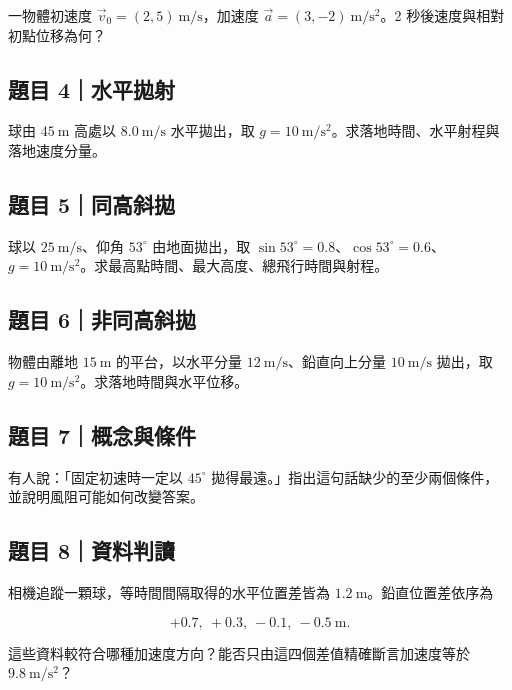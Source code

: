 \documentclass[11pt,a4paper]{article}
\begin{document}
一物體初速度 \(\vec v_0=(2,5)\ \mathrm{m/s}\)，加速度 \(\vec a=(3,-2)\ \mathrm{m/s^2}\)。2 秒後速度與相對初點位移為何？

\subsection{題目 4｜水平拋射}\label{ux984cux76ee-4ux6c34ux5e73ux62cbux5c04}

球由 \(45\ \mathrm{m}\) 高處以 \(8.0\ \mathrm{m/s}\) 水平拋出，取 \(g=10\ \mathrm{m/s^2}\)。求落地時間、水平射程與落地速度分量。

\subsection{題目 5｜同高斜拋}\label{ux984cux76ee-5ux540cux9ad8ux659cux62cb}

球以 \(25\ \mathrm{m/s}\)、仰角 \(53^\circ\) 由地面拋出，取 \(\sin53^\circ=0.8\)、\(\cos53^\circ=0.6\)、\(g=10\ \mathrm{m/s^2}\)。求最高點時間、最大高度、總飛行時間與射程。

\subsection{題目 6｜非同高斜拋}\label{ux984cux76ee-6ux975eux540cux9ad8ux659cux62cb}

物體由離地 \(15\ \mathrm{m}\) 的平台，以水平分量 \(12\ \mathrm{m/s}\)、鉛直向上分量 \(10\ \mathrm{m/s}\) 拋出，取 \(g=10\ \mathrm{m/s^2}\)。求落地時間與水平位移。

\subsection{題目 7｜概念與條件}\label{ux984cux76ee-7ux6982ux5ff5ux8207ux689dux4ef6}

有人說：「固定初速時一定以 \(45^\circ\) 拋得最遠。」指出這句話缺少的至少兩個條件，並說明風阻可能如何改變答案。

\subsection{題目 8｜資料判讀}\label{ux984cux76ee-8ux8cc7ux6599ux5224ux8b80}

相機追蹤一顆球，等時間間隔取得的水平位置差皆為 \(1.2\ \mathrm{m}\)。鉛直位置差依序為

\[
+0.7,\ +0.3,\ -0.1,\ -0.5\ \mathrm{m}.
\]

這些資料較符合哪種加速度方向？能否只由這四個差值精確斷言加速度等於 \(9.8\ \mathrm{m/s^2}\)？
\end{document}
